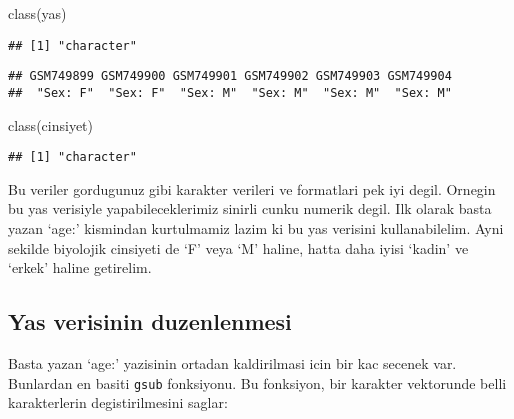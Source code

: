 \documentclass[
]{book}
\newenvironment{Shaded}{\begin{snugshade}}{\end{snugshade}}
\newcommand{\FloatTok}[1]{\textcolor[rgb]{0.00,0.00,0.81}{#1}}
\newcommand{\FunctionTok}[1]{\textcolor[rgb]{0.00,0.00,0.00}{#1}}
\newcommand{\NormalTok}[1]{#1}
\newcommand{\OtherTok}[1]{\textcolor[rgb]{0.56,0.35,0.01}{#1}}
\newcommand{\SpecialCharTok}[1]{\textcolor[rgb]{0.00,0.00,0.00}{#1}}
\begin{document}
\begin{Shaded}
\begin{Highlighting}[]
\FunctionTok{class}\NormalTok{(yas)}
\end{Highlighting}
\end{Shaded}

\begin{verbatim}
## [1] "character"
\end{verbatim}

\begin{Shaded}
\end{Shaded}

\begin{verbatim}
## GSM749899 GSM749900 GSM749901 GSM749902 GSM749903 GSM749904 
##  "Sex: F"  "Sex: F"  "Sex: M"  "Sex: M"  "Sex: M"  "Sex: M"
\end{verbatim}

\begin{Shaded}
\begin{Highlighting}[]
\FunctionTok{class}\NormalTok{(cinsiyet)}
\end{Highlighting}
\end{Shaded}

\begin{verbatim}
## [1] "character"
\end{verbatim}

Bu veriler gordugunuz gibi karakter verileri ve formatlari pek iyi degil. Ornegin bu yas verisiyle yapabileceklerimiz sinirli cunku numerik degil. Ilk olarak basta yazan `age:' kismindan kurtulmamiz lazim ki bu yas verisini kullanabilelim. Ayni sekilde biyolojik cinsiyeti de `F' veya `M' haline, hatta daha iyisi `kadin' ve `erkek' haline getirelim.

\hypertarget{yas-verisinin-duzenlenmesi}{%
\subsection{Yas verisinin duzenlenmesi}\label{yas-verisinin-duzenlenmesi}}

Basta yazan `age:' yazisinin ortadan kaldirilmasi icin bir kac secenek var. Bunlardan en basiti \texttt{gsub} fonksiyonu. Bu fonksiyon, bir karakter vektorunde belli karakterlerin degistirilmesini saglar:
\end{document}
